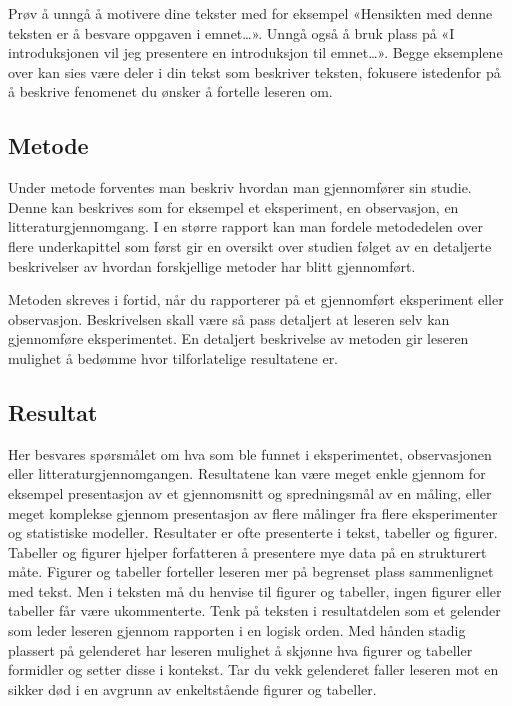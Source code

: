 \documentclass[
  letterpaper,
  DIV=11,
  numbers=noendperiod,
  oneside]{scrreprt}
\begin{document}
Prøv å unngå å motivere dine tekster med for eksempel «Hensikten med
denne teksten er å besvare oppgaven i emnet\ldots». Unngå også å bruk
plass på «I introduksjonen vil jeg presentere en introduksjon til
emnet\ldots». Begge eksemplene over kan sies være deler i din tekst som
beskriver teksten, fokusere istedenfor på å beskrive fenomenet du ønsker
å fortelle leseren om.

\hypertarget{metode}{%
\subsection{Metode}\label{metode}}

Under metode forventes man beskriv hvordan man gjennomfører sin studie.
Denne kan beskrives som for eksempel et eksperiment, en observasjon, en
litteraturgjennomgang. I en større rapport kan man fordele metodedelen
over flere underkapittel som først gir en oversikt over studien følget
av en detaljerte beskrivelser av hvordan forskjellige metoder har blitt
gjennomført.

Metoden skreves i fortid, når du rapporterer på et gjennomført
eksperiment eller observasjon. Beskrivelsen skall være så pass detaljert
at leseren selv kan gjennomføre eksperimentet. En detaljert beskrivelse
av metoden gir leseren mulighet å bedømme hvor tilforlatelige
resultatene er.

\hypertarget{resultat}{%
\subsection{Resultat}\label{resultat}}

Her besvares spørsmålet om hva som ble funnet i eksperimentet,
observasjonen eller litteraturgjennomgangen. Resultatene kan være meget
enkle gjennom for eksempel presentasjon av et gjennomsnitt og
spredningsmål av en måling, eller meget komplekse gjennom presentasjon
av flere målinger fra flere eksperimenter og statistiske modeller.
Resultater er ofte presenterte i tekst, tabeller og figurer. Tabeller og
figurer hjelper forfatteren å presentere mye data på en strukturert
måte. Figurer og tabeller forteller leseren mer på begrenset plass
sammenlignet med tekst. Men i teksten må du henvise til figurer og
tabeller, ingen figurer eller tabeller får være ukommenterte. Tenk på
teksten i resultatdelen som et gelender som leder leseren gjennom
rapporten i en logisk orden. Med hånden stadig plassert på gelenderet
har leseren mulighet å skjønne hva figurer og tabeller formidler og
setter disse i kontekst. Tar du vekk gelenderet faller leseren mot en
sikker død i en avgrunn av enkeltstående figurer og tabeller.
\end{document}
